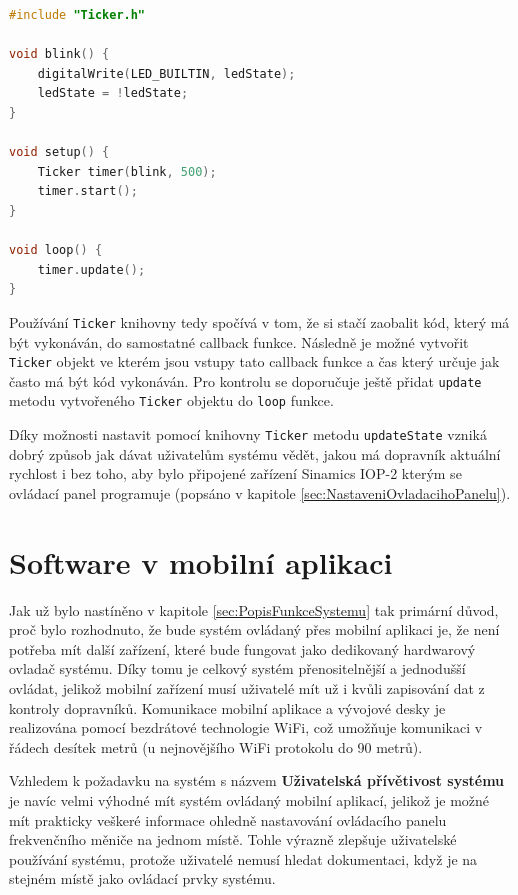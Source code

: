 \begin{lstlisting}[language=C++, caption={Způsob používání \texttt{Ticker} knihovny}, label={lst:TickerKnihovnaExample}]
#include "Ticker.h"

void blink() {
	digitalWrite(LED_BUILTIN, ledState);
	ledState = !ledState;
}

void setup() {
	Ticker timer(blink, 500);
	timer.start();
}

void loop() {
	timer.update();
}
\end{lstlisting}

Používání \texttt{Ticker} knihovny tedy spočívá v tom, že si stačí zaobalit kód, který má být vykonáván, do samostatné callback funkce. Následně je možné vytvořit \texttt{Ticker} objekt ve kterém jsou vstupy tato callback funkce a čas který určuje jak často má být kód vykonáván. Pro kontrolu se doporučuje ještě přidat \texttt{update} metodu vytvořeného \texttt{Ticker} objektu do \texttt{loop} funkce.

Díky možnosti nastavit pomocí knihovny \texttt{Ticker} metodu \texttt{updateState} vzniká dobrý způsob jak dávat uživatelům systému vědět, jakou má dopravník aktuální rychlost i bez toho, aby bylo připojené zařízení Sinamics IOP-2 kterým se ovládací panel programuje (popsáno v kapitole \ref{sec:NastaveniOvladacihoPanelu}).

\section{Software v mobilní aplikaci}\label{sec:SoftwareVMobilniAplikaci}

Jak už bylo nastíněno v kapitole \ref{sec:PopisFunkceSystemu} tak primární důvod, proč bylo rozhodnuto, že bude systém ovládaný přes mobilní aplikaci je, že není potřeba mít další zařízení, které bude fungovat jako dedikovaný hardwarový ovladač systému. Díky tomu je celkový systém přenositelnější a jednodušší ovládat, jelikož mobilní zařízení musí uživatelé mít už i kvůli zapisování dat z kontroly dopravníků. Komunikace mobilní aplikace a vývojové desky je realizována pomocí bezdrátové technologie WiFi, což umožňuje komunikaci v řádech desítek metrů (u nejnovějšího WiFi protokolu do 90 metrů).
\cite{DosahWIFIProtokolu}

Vzhledem k požadavku na systém s názvem \textbf{Uživatelská přívětivost systému} je navíc velmi výhodné mít systém ovládaný mobilní aplikací, jelikož je možné mít prakticky veškeré informace ohledně nastavování ovládacího panelu frekvenčního měniče na jednom místě. Tohle výrazně zlepšuje uživatelské používání systému, protože uživatelé nemusí hledat dokumentaci, když je na stejném místě jako ovládací prvky systému.

